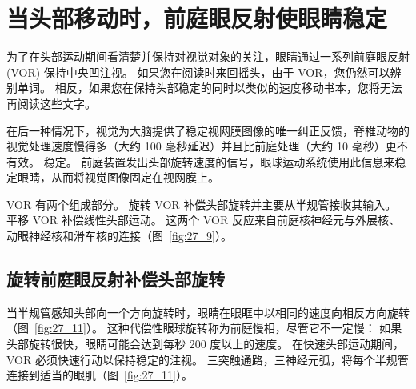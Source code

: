 \section{当头部移动时，前庭眼反射使眼睛稳定}

为了在头部运动期间看清楚并保持对视觉对象的关注，眼睛通过一系列前庭眼反射 (VOR) 保持中央凹注视。
如果您在阅读时来回摇头，由于 VOR，您仍然可以辨别单词。
相反，如果您在保持头部稳定的同时以类似的速度移动书本，您将无法再阅读这些文字。


在后一种情况下，视觉为大脑提供了稳定视网膜图像的唯一纠正反馈，脊椎动物的视觉处理速度慢得多（大约 100 毫秒延迟）并且比前庭处理（大约 10 毫秒）更不有效。 稳定。
前庭装置发出头部旋转速度的信号，眼球运动系统使用此信息来稳定眼睛，从而将视觉图像固定在视网膜上。


VOR 有两个组成部分。
旋转 VOR 补偿头部旋转并主要从半规管接收其输入。
平移 VOR 补偿线性头部运动。
这两个 VOR 反应来自前庭核神经元与外展核、动眼神经核和滑车核的连接（图~\ref{fig:27_9}）。



\subsection{旋转前庭眼反射补偿头部旋转}

当半规管感知头部向一个方向旋转时，眼睛在眼眶中以相同的速度向相反方向旋转（图~\ref{fig:27_11}）。 
这种代偿性眼球旋转称为前庭慢相，尽管它不一定慢：
如果头部旋转很快，眼睛可能会达到每秒 200 度以上的速度。
在快速头部运动期间，VOR 必须快速行动以保持稳定的注视。
三突触通路，三神经元弧，将每个半规管连接到适当的眼肌（图~\ref{fig:27_11}）。



